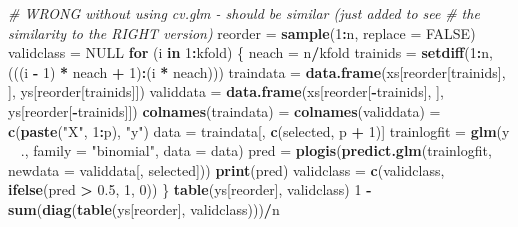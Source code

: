 \documentclass[]{article}
\newenvironment{Shaded}{\begin{snugshade}}{\end{snugshade}}
\newcommand{\CommentTok}[1]{\textcolor[rgb]{0.56,0.35,0.01}{\textit{#1}}}
\newcommand{\ControlFlowTok}[1]{\textcolor[rgb]{0.13,0.29,0.53}{\textbf{#1}}}
\newcommand{\DataTypeTok}[1]{\textcolor[rgb]{0.13,0.29,0.53}{#1}}
\newcommand{\DecValTok}[1]{\textcolor[rgb]{0.00,0.00,0.81}{#1}}
\newcommand{\FloatTok}[1]{\textcolor[rgb]{0.00,0.00,0.81}{#1}}
\newcommand{\KeywordTok}[1]{\textcolor[rgb]{0.13,0.29,0.53}{\textbf{#1}}}
\newcommand{\NormalTok}[1]{#1}
\newcommand{\OperatorTok}[1]{\textcolor[rgb]{0.81,0.36,0.00}{\textbf{#1}}}
\newcommand{\OtherTok}[1]{\textcolor[rgb]{0.56,0.35,0.01}{#1}}
\newcommand{\StringTok}[1]{\textcolor[rgb]{0.31,0.60,0.02}{#1}}
\begin{document}
\begin{Shaded}
\begin{Highlighting}[]
{{\CommentTok{# WRONG without using cv.glm - should be similar (just added to see}
\CommentTok{# the similarity to the RIGHT version)}
\NormalTok{reorder =}\StringTok{ }\KeywordTok{sample}\NormalTok{(}\DecValTok{1}\OperatorTok{:}\NormalTok{n, }\DataTypeTok{replace =} \OtherTok{FALSE}\NormalTok{)}
\NormalTok{validclass =}\StringTok{ }\OtherTok{NULL}
\ControlFlowTok{for}\NormalTok{ (i }\ControlFlowTok{in} \DecValTok{1}\OperatorTok{:}\NormalTok{kfold) \{}
\NormalTok{    neach =}\StringTok{ }\NormalTok{n}\OperatorTok{/}\NormalTok{kfold}
\NormalTok{    trainids =}\StringTok{ }\KeywordTok{setdiff}\NormalTok{(}\DecValTok{1}\OperatorTok{:}\NormalTok{n, (((i }\OperatorTok{-}\StringTok{ }\DecValTok{1}\NormalTok{) }\OperatorTok{*}\StringTok{ }\NormalTok{neach }\OperatorTok{+}\StringTok{ }\DecValTok{1}\NormalTok{)}\OperatorTok{:}\NormalTok{(i }\OperatorTok{*}\StringTok{ }\NormalTok{neach)))}
\NormalTok{    traindata =}\StringTok{ }\KeywordTok{data.frame}\NormalTok{(xs[reorder[trainids], ], ys[reorder[trainids]])}
\NormalTok{    validdata =}\StringTok{ }\KeywordTok{data.frame}\NormalTok{(xs[reorder[}\OperatorTok{-}\NormalTok{trainids], ], ys[reorder[}\OperatorTok{-}\NormalTok{trainids]])}
    \KeywordTok{colnames}\NormalTok{(traindata) =}\StringTok{ }\KeywordTok{colnames}\NormalTok{(validdata) =}\StringTok{ }\KeywordTok{c}\NormalTok{(}\KeywordTok{paste}\NormalTok{(}\StringTok{"X"}\NormalTok{, }\DecValTok{1}\OperatorTok{:}\NormalTok{p), }\StringTok{"y"}\NormalTok{)}
\NormalTok{    data =}\StringTok{ }\NormalTok{traindata[, }\KeywordTok{c}\NormalTok{(selected, p }\OperatorTok{+}\StringTok{ }\DecValTok{1}\NormalTok{)]}
\NormalTok{    trainlogfit =}\StringTok{ }\KeywordTok{glm}\NormalTok{(y }\OperatorTok{~}\StringTok{ }\NormalTok{., }\DataTypeTok{family =} \StringTok{"binomial"}\NormalTok{, }\DataTypeTok{data =}\NormalTok{ data)}
\NormalTok{    pred =}\StringTok{ }\KeywordTok{plogis}\NormalTok{(}\KeywordTok{predict.glm}\NormalTok{(trainlogfit, }\DataTypeTok{newdata =}\NormalTok{ validdata[, selected]))}
    \KeywordTok{print}\NormalTok{(pred)}
\NormalTok{    validclass =}\StringTok{ }\KeywordTok{c}\NormalTok{(validclass, }\KeywordTok{ifelse}\NormalTok{(pred }\OperatorTok{>}\StringTok{ }\FloatTok{0.5}\NormalTok{, }\DecValTok{1}\NormalTok{, }\DecValTok{0}\NormalTok{))}
\NormalTok{\}}
\KeywordTok{table}\NormalTok{(ys[reorder], validclass)}
\DecValTok{1} \OperatorTok{-}\StringTok{ }\KeywordTok{sum}\NormalTok{(}\KeywordTok{diag}\NormalTok{(}\KeywordTok{table}\NormalTok{(ys[reorder], validclass)))}\OperatorTok{/}\NormalTok{n}

}}
\end{Highlighting}
\end{Shaded}
\end{document}
